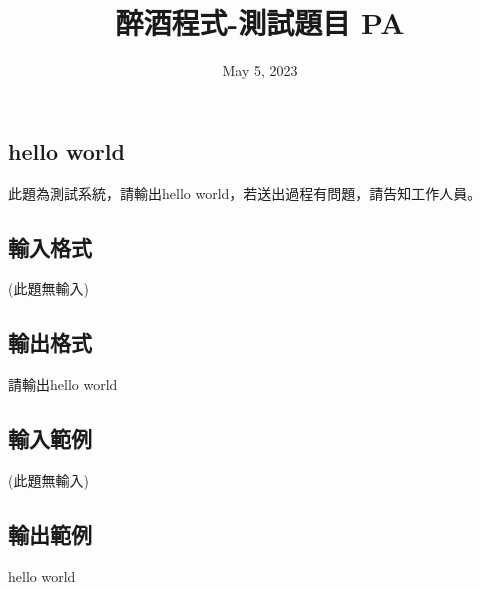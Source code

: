 \documentclass{article}
\title{醉酒程式-測試題目 PA}
\date{May 5, 2023}
\begin{document}
\begin{CJK*}{UTF8}{bsmi}

\maketitle

\section*{hello world}
此題為測試系統，請輸出hello world，若送出過程有問題，請告知工作人員。

\subsection*{輸入格式}
(此題無輸入)

\subsection*{輸出格式}
請輸出hello world

\subsection*{輸入範例}
(此題無輸入)

\subsection*{輸出範例}
hello world

\end{CJK*}
\end{document}

